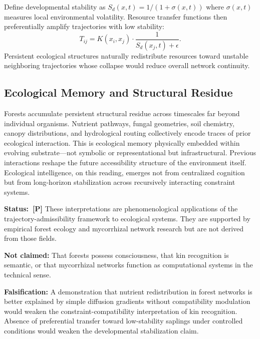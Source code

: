 Define developmental stability as $S_d(x,t) = 1/(1+\sigma(x,t))$ where
$\sigma(x,t)$ measures local environmental volatility. Resource transfer functions
then preferentially amplify trajectories with low stability:
\[
  T_{ij} = K(x_i,x_j) \cdot \frac{1}{S_d(x_j,t)+\epsilon}.
\]
Persistent ecological structures naturally redistribute resources toward unstable
neighboring trajectories whose collapse would reduce overall network continuity.

\subsection{Ecological Memory and Structural Residue}

\claimP Forests accumulate persistent structural residue across timescales far
beyond individual organisms. Nutrient pathways, fungal geometries, soil chemistry,
canopy distributions, and hydrological routing collectively encode traces of prior
ecological interaction. This is ecological memory physically embedded within
evolving substrate---not symbolic or representational but infrastructural.
Previous interactions reshape the future accessibility structure of the environment
itself. Ecological intelligence, on this reading, emerges not from centralized
cognition but from long-horizon stabilization across recursively interacting
constraint systems.

\begin{constraintboundary}
\textbf{Status:~\textbf{[P]}} These interpretations are phenomenological
applications of the trajectory-admissibility framework to ecological systems.
They are supported by empirical forest ecology and mycorrhizal network research
but are not derived from those fields.

\textbf{Not claimed:} That forests possess consciousness, that kin recognition
is semantic, or that mycorrhizal networks function as computational systems in
the technical sense.

\textbf{Falsification:} A demonstration that nutrient redistribution in forest
networks is better explained by simple diffusion gradients without compatibility
modulation would weaken the constraint-compatibility interpretation of kin
recognition. Absence of preferential transfer toward low-stability saplings
under controlled conditions would weaken the developmental stabilization claim.
\end{constraintboundary}
